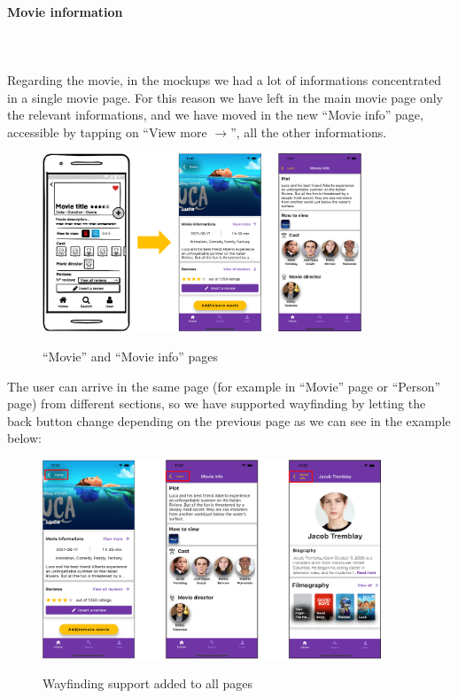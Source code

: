 \documentclass[12pt, a4paper]{article}
\numberwithin{figure}{section}
\begin{document}
\paragraph{Movie information}
\mbox{}\\\\
Regarding the movie, in the mockups we had a lot of informations concentrated in a single movie page. For this reason
we have left in the main movie page only the relevant informations, and we have moved in the new “Movie info” page, accessible
by tapping on “View more $\rightarrow$”, all the other informations.\\

\begin{figure}[H]
	\centering
	\includegraphics[width=0.85\textwidth]{images/prototype1/movieInfo.png}\\
	\caption{“Movie” and “Movie info” pages}
\end{figure}

\noindent
The user can arrive in the same page (for example in “Movie” page or “Person” page) from different sections,
so we have supported wayfinding by letting the back button change depending on the previous page as
we can see in the example below:
\begin{figure}[H]
	\centering
	\includegraphics[width=0.9\textwidth]{images/prototype1/wayfinding.png}\\
	\caption{Wayfinding support added to all pages}
\end{figure}
\end{document}
